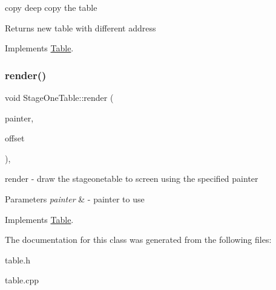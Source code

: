 copy deep copy the table 

\begin{DoxyReturn}{Returns}
new table with different address 
\end{DoxyReturn}


Implements \mbox{\hyperlink{class_table_a881295d0bea9823026471422ec203c6e}{Table}}.

\mbox{\label{class_stage_one_table_a1f6dac59ce45c370f94fb3710f744ceb}} 
\subsubsection{\texorpdfstring{render()}{render()}}
{\footnotesize\ttfamily void Stage\+One\+Table\+::render (\begin{DoxyParamCaption}\item[{Q\+Painter \&}]{painter,  }\item[{const Q\+Vector2D \&}]{offset }\end{DoxyParamCaption})\hspace{0.3cm}{\ttfamily [override]}, {\ttfamily [virtual]}}



render -\/ draw the stageonetable to screen using the specified painter 


\begin{DoxyParams}{Parameters}
{\em painter} & -\/ painter to use \\
\hline
\end{DoxyParams}


Implements \mbox{\hyperlink{class_table_a827dac18920a95b3e0ef006183514654}{Table}}.



The documentation for this class was generated from the following files\+:\begin{DoxyCompactItemize}
\item 
table.\+h\item 
table.\+cpp\end{DoxyCompactItemize}
